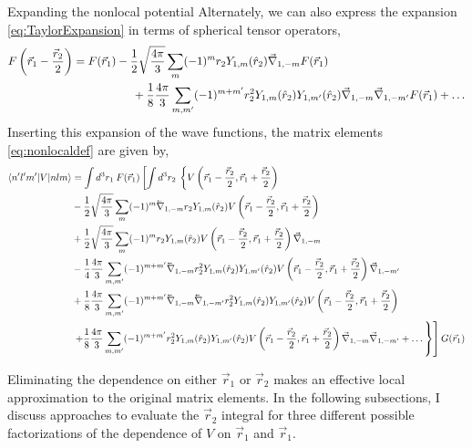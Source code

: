 \begin{section}{Expanding the nonlocal potential}
Alternately, we can also express the expansion \eqref{eq:TaylorExpansion} in terms of spherical tensor operators,
\begin{align}
\begin{split}
F\left(\vec{r}_1-\frac{\vec{r}_2}{2}\right)=
F(\vec{r}_1)&-\frac{1}{2}\sqrt{\frac{4\pi}{3}}\sum_{m}(-1)^m r_2 Y_{1,m}(\hat{r}_2) \vec{\nabla}_{1,-m} F(\vec{r}_1) \\
&\hspace{.5cm}+\frac{1}{8}\frac{4\pi}{3}\sum_{m,m'}(-1)^{m+m'}r_2^2 Y_{1,m}(\hat{r}_2)Y_{1,m'}(\hat{r}_2)\vec{\nabla}_{1,-m}\vec{\nabla}_{1,-m'}F(\vec{r}_1)
+\dots 
\end{split}
\end{align}
Inserting this expansion of the wave functions, the matrix elements \eqref{eq:nonlocaldef} are given by,
\begin{equation}\label{eq:expansionSpherical}
\begin{split}
\braket{n' l' m'| V | n l m} &= \int d^3r_1\: F(\vec{r}_1)\left[\int d^3r_2\:\left\{V\left(\vec{r}_1-\frac{\vec{r}_2}{2},\vec{r}_1+\frac{\vec{r}_2}{2}\right) \right.\right. \\
&-\frac{1}{2}\sqrt{\frac{4\pi}{3}}\sum_m (-1)^m \lvec{\nabla}_{1,-m} r_2Y_{1,m}(\hat{r}_2)V\left(\vec{r}_1-\frac{\vec{r}_2}{2},\vec{r}_1+\frac{\vec{r}_2}{2}\right)\\
&+\frac{1}{2}\sqrt{\frac{4\pi}{3}}\sum_m (-1)^m r_2Y_{1,m}(\hat{r}_2)V\left(\vec{r}_1-\frac{\vec{r}_2}{2},\vec{r}_1+\frac{\vec{r}_2}{2}\right) \vec{\nabla}_{1,-m} \\
&-\frac{1}{4}\frac{4\pi}{3}\sum_{m,m'}(-1)^{m+m'}\lvec{\nabla}_{1,-m} r_2^2 Y_{1,m}(\hat{r}_2)Y_{1,m'}(\hat{r}_2)V\left(\vec{r}_1-\frac{\vec{r}_2}{2},\vec{r}_1+\frac{\vec{r}_2}{2}\right) \vec{\nabla}_{1,-m'}\\
&+\frac{1}{8}\frac{4\pi}{3}\sum_{m,m'}(-1)^{m+m'}\lvec{\nabla}_{1,-m}\lvec{\nabla}_{1,-m'} r_2^2 Y_{1,m}(\hat{r}_2)Y_{1,m'}(\hat{r}_2)V\left(\vec{r}_1-\frac{\vec{r}_2}{2},\vec{r}_1+\frac{\vec{r}_2}{2}\right) \\
&\left.\left.+\frac{1}{8}\frac{4\pi}{3}\sum_{m,m'}(-1)^{m+m'} r_2^2 Y_{1,m}(\hat{r}_2)Y_{1,m'}(\hat{r}_2)V\left(\vec{r}_1-\frac{\vec{r}_2}{2},\vec{r}_1+\frac{\vec{r}_2}{2}\right)\vec{\nabla}_{1,-m}\vec{\nabla}_{1,-m'}+\dots \right\}\right]G(\vec{r}_1)
\end{split}
\end{equation}

Eliminating the dependence on either $\vec{r}_1$ or $\vec{r}_2$ makes an effective local approximation to the original matrix elements. In the following subsections, I discuss approaches to evaluate the $\vec{r}_2$ integral for three different possible factorizations of the dependence of $V$ on $\vec{r}_1$ and  $\vec{r}_1$.


\end{section}
